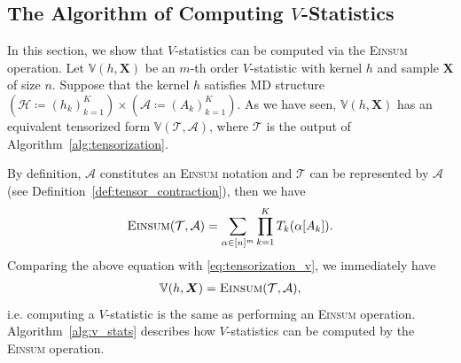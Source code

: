 \documentclass[sn-mathphys, natbib=false]{sn-jnl}
\newcommand{\pdfv}{\texorpdfstring{$V$}{V}}
\theoremstyle{plain}
\theoremstyle{definition}
\def\Einsum{\textsc{Einsum}}
\newcommand{\vstat}{\mathbb{V}}
\newcommand{\tensorcontraction}{\textsc{Einsum}}
\newcommand{\bbR}{{\mathbb{R}}}
\def\bbX{\mathbb{X}}
\def\calA{\mathcal{A}}
\def\calT{\mathcal{T}}
\def\calH{\mathcal{H}}
\begin{document}
\begin{bibunit}[agsm]

\subsection{The Algorithm of Computing \pdfv{}-Statistics}
\label{sec:alg_v}

In this section, we show that $V$-statistics can be computed via the \Einsum{} operation. Let $\vstat(h, \bm{X})$ be an $m$-th order $V$-statistic with kernel $h$ and sample $\bm{X}$ of size $n$. Suppose that the kernel $h$ satisfies MD structure $(\calH \coloneqq (h_k)_{k=1}^K) \times (\calA \coloneqq (A_k)_{k=1}^K)$. As we have seen, $\vstat(h, \bm{X})$ has an equivalent tensorized form $\vstat(\calT, \calA)$, where $\calT$ is the output of Algorithm~\ref{alg:tensorization}. 

By definition, $\calA$ constitutes an \Einsum{} notation and $\calT$ can be represented by $\calA$ (see Definition~\ref{def:tensor_contraction}), then we have
\begin{equation*}
    \tensorcontraction(\calT, \calA) = \sum_{\alpha \in [n]^m} \prod_{k=1}^K T_k(\alpha[A_k]). 
\end{equation*}
Comparing the above equation with \eqref{eq:tensorization_v}, we immediately have 
\begin{align*}
    \vstat(h, \bm{X}) = \tensorcontraction(\calT, \calA), 
\end{align*}
i.e. computing a $V$-statistic is the same as performing an \Einsum{} operation. Algorithm~\ref{alg:v_stats} describes how $V$-statistics can be computed by the \Einsum{} operation.


\end{bibunit}
\end{document}
